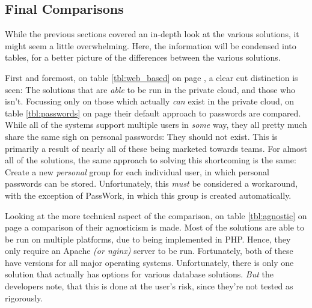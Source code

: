 		\subsection{Final Comparisons}
			\newcommand{\red}[1]{\cellcolor{red!50}#1}
			\newcommand{\green}[1]{\cellcolor{green!50}#1}
			\newcommand{\grey}[1]{\cellcolor{gray!50}#1}
			\newcommand{\yellow}[1]{\cellcolor{yellow!50}#1}
			\newcommand{\white}[1]{\cellcolor{white!50}#1}


			While the previous sections covered an in-depth look at the various solutions, it might seem a little overwhelming. Here, the information will be condensed into tables, for a better picture of the differences between the various solutions.

			First and foremost, on table \ref{tbl:web_based} on page \pageref{tbl:web_based}, a clear cut distinction is seen: The solutions that are \emph{able} to be run in the private cloud, and those who isn't. Focussing only on those which actually \emph{can} exist in the private cloud, on table \ref{tbl:passwords} on page \pageref{tbl:passwords} their default approach to passwords are compared. While all of the systems support multiple users in \emph{some} way, they all pretty much share the same sigh on personal passwords: They should not exist. This is primarily a result of nearly all of these being marketed towards teams. For almost all of the solutions, the same approach to solving this shortcoming is the same: Create a new \emph{personal} group for each individual user, in which personal passwords can be stored. Unfortunately, this \emph{must} be considered a workaround, with the exception of PassWork, in which this group is created automatically. 

			Looking at the more technical aspect of the comparison, on table \ref{tbl:agnostic} on page \pageref{tbl:agnostic} a comparison of their agnosticism is made. Most of the solutions are able to be run on multiple platforms, due to being implemented in PHP. Hence, they only require an Apache \emph{(or nginx)} server to be run. Fortunately, both of these have versions for all major operating systems. Unfortunately, there is only one solution that actually has options for various database solutions. \emph{But} the developers note, that this is done at the user's risk, since they're not tested as rigorously.



